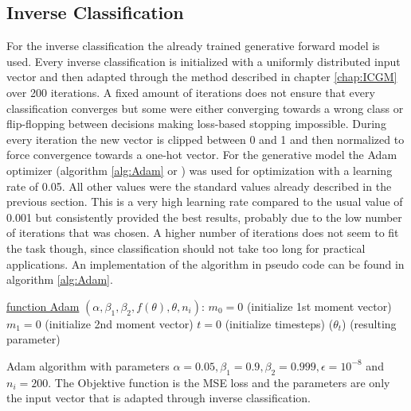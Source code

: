 	
\subsection{Inverse Classification}
\label{subsec:inverse_classification}
	For the inverse classification the already trained generative forward model is used. Every inverse classification is initialized with a uniformly distributed input vector and then adapted through the method described in chapter \ref{chap:ICGM} over 200 iterations. A fixed amount of iterations does not ensure that every classification converges but some were either converging towards a wrong class or flip-flopping between decisions making loss-based stopping impossible. During every iteration the new vector is clipped between 0 and 1 and then normalized to force convergence towards a one-hot vector.
	For the generative model the Adam optimizer (algorithm \ref{alg:Adam} or \cite{AdamKingmaB14}) was used for optimization with a learning rate of 0.05. All other values were the standard values already described in the previous section. This is a very high learning rate compared to the usual value of 0.001 but consistently provided the best results, probably due to the low number of iterations that was chosen. A higher number of iterations does not seem to fit the task though, since classification should not take too long for practical applications. An implementation of the algorithm in pseudo code can be found in algorithm \ref{alg:Adam}.
	
	\begin{algorithm}
		
		\underline{function Adam} $(\alpha,\beta_1, \beta_2, f(\theta), \theta, n_i)$:\;
		$m _0 = 0$ (initialize 1st moment vector)\;
		$m_1 = 0$ (initialize 2nd moment vector)\;
		$t = 0$ (initialize timesteps)\;
		\Return($\theta_t$) (resulting parameter)
		\caption{Adam algorithm with parameters $\alpha = 0.05, \beta_1 = 0.9, \beta_2 = 0.999, \epsilon = 10^{-8}$ and $n_i = 200$. The Objektive function is the MSE loss and the parameters are only the input vector that is adapted through inverse classification.}
		\label{alg:Adam}
	\end{algorithm}
	
